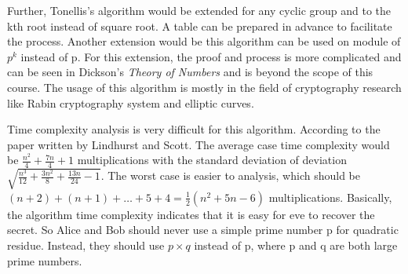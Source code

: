 \documentclass[catalog.tex]{subfiles}
\begin{document}
Further, Tonellis's algorithm would be extended for any cyclic group and to the kth root instead of square root. A table can be prepared in advance to facilitate the process. Another extension would be this algorithm can be used on module of $p^k$ instead of p. For this extension, the proof and process is more complicated and can be seen in Dickson's \emph{Theory of Numbers}\cite{dickson} and is beyond the scope of this course\cite{wiki}. The usage of this algorithm is mostly in the field of cryptography research like Rabin cryptography system and elliptic curves.\newline

Time complexity analysis is very difficult for this algorithm. According to the paper written by Lindhurst and Scott. The average case time complexity would be $\frac{n^{2}}{4}+\frac{7 n}{4}+1$ multiplications with the standard deviation of deviation $\sqrt{\frac{n^{3}}{12}+\frac{3 n^{2}}{8}+\frac{13 n}{24}-1}$\cite{lindhurst1997analysis}. The worst case is easier to analysis, which should be $(n+2)+(n+1)+\ldots+5+4 = \frac{1}{2}\left(n^{2}+5 n-6\right)$ multiplications. Basically, the algorithm time complexity indicates that it is easy for eve to recover the secret. So Alice and Bob should never use a simple prime number p for quadratic residue. Instead, they should use $p\times q$ instead of p, where p and q are both large prime numbers.
\end{document}
